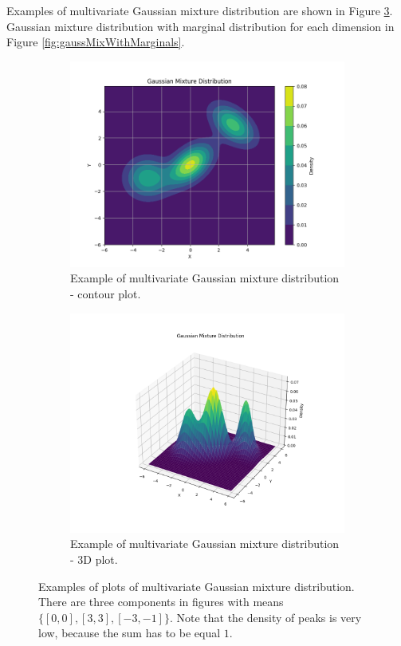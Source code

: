 Examples of multivariate Gaussian mixture distribution are shown in Figure \ref{fig:mvn_mixture_plot}. Gaussian mixture distribution with marginal distribution for each dimension in Figure \ref{fig:gaussMixWithMarginals}.
\begin{figure}[htbp]
    \centering
    \begin{subfigure}[b]{0.45\textwidth}
        \centering
        \includegraphics[width=\textwidth]{text/chapter_01/imgs/mvn_mixture_contour}
        \caption{Example of multivariate Gaussian mixture distribution - contour plot.}
        \label{fig:mvn_mixture_contour}
    \end{subfigure}
    \hfill
    \begin{subfigure}[b]{0.45\textwidth}
        \centering
        \includegraphics[width=\textwidth]{text/chapter_01/imgs/mvn_mixture_3d}
        \caption{Example of multivariate Gaussian mixture distribution - 3D plot.}
        \label{fig:mvn_mixture_3d}
    \end{subfigure}
    \caption{Examples of plots of multivariate Gaussian mixture distribution. There are three components in figures with means $\{[0, 0], [3, 3], [-3, -1]\}$. Note that the density of peaks is very low, because the sum has to be equal $1$.}
    \label{fig:mvn_mixture_plot}
\end{figure}

